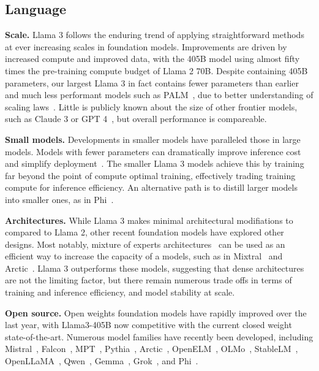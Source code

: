 \subsection{Language}
\label{section:related_work_language}

\textbf{Scale.}
Llama 3 follows the enduring trend of applying straightforward methods at ever increasing scales in foundation models. Improvements are driven by increased compute and improved data, with the 405B model using almost fifty times the pre-training compute budget of Llama 2 70B. Despite containing 405B parameters, our largest Llama 3 in fact contains fewer parameters than earlier and much less performant models such as PALM~\citep{chowdhery2023palm}, due to better understanding of scaling laws~\citep{kaplan2020scaling,hoffmann2022chinchilla}. Little is publicly known about the size of other frontier models, such as Claude 3 or GPT 4~\citep{openai2023gpt4}, but overall performance is compareable. 

\textbf{Small models.}
Developments in smaller models have paralleled those in large models. 
Models with fewer parameters can dramatically improve inference cost and simplify deployment~\citep{mehta2024openelm,team2024gemma}.
The smaller Llama 3 models achieve this by training far beyond the point of compute optimal training, effectively trading training compute for inference efficiency.
An alternative path is to distill larger models into smaller ones, as in Phi~\citep{abdin2024phi}.

\textbf{Architectures.}
While Llama 3 makes minimal architectural modifiations to compared to Llama 2, other recent foundation models have explored other designs. Most notably, mixture of experts architectures~\citep{shazeer2017moe,lewis2021base,fedus2022switch,zhou2022mixture} can be used as an efficient way to increase the capacity of a models, such as in Mixtral~\citep{jiang2024mixtral} and Arctic~\citep{snowflakearctic}. Llama 3 outperforms these models, suggesting that dense architectures are not the limiting factor, but there remain numerous trade offs in terms of training and inference efficiency, and model stability at scale.

\textbf{Open source.}
Open weights foundation models have rapidly improved over the last year, with Llama3-405B now competitive with the current closed weight state-of-the-art. 
Numerous model families have recently been developed, including Mistral~\citep{jiang2023mistral}, Falcon~\citep{almazrouei2023falcon}, MPT~\citep{databricksmpt}, Pythia~\citep{biderman2023pythia}, Arctic~\citep{snowflakearctic}, OpenELM~\citep{mehta2024openelm}, OLMo~\citep{groeneveld2024olmoacceleratingsciencelanguage}, StableLM~\citep{bellagente2024stable}, OpenLLaMA~\citep{openlm2023openllama}, Qwen~\citep{bai2023qwen}, Gemma~\citep{team2024gemma}, Grok~\citep{xaigrok}, and Phi~\citep{abdin2024phi}.

